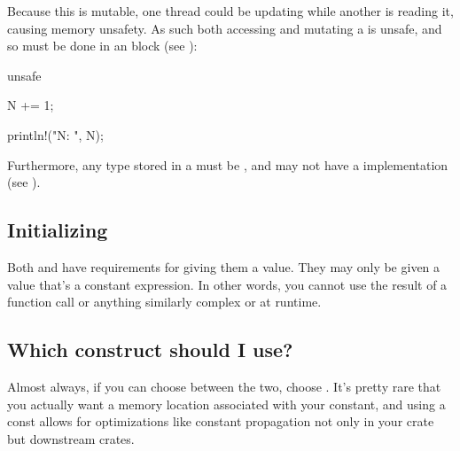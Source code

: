 Because this is mutable, one thread could be updating  while another is reading it, causing memory unsafety. As such both 
accessing and mutating a  is unsafe, and so must be done in an  block (see ):

\begin{rustc}
unsafe {
    N += 1;

    println!("N: {}", N);
}
\end{rustc}

Furthermore, any type stored in a  must be , and may not have a  implementation (see ).

\subsection*{Initializing}

Both  and  have requirements for giving them a value. They may only be given a value that's a constant 
expression. In other words, you cannot use the result of a function call or anything similarly complex or at runtime.

\subsection*{Which construct should I use?}

Almost always, if you can choose between the two, choose . It's pretty rare that you actually want a memory location 
associated with your constant, and using a const allows for optimizations like constant propagation not only in your crate but 
downstream crates.
